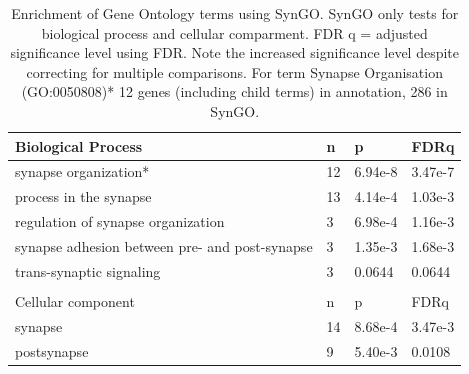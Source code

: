 \begin{table}[]
    \centering
    \begin{tabular}{llll}
    Biological Process & n & p & FDRq\\
    \hline
synapse organization*&	12&	6.94e-8	&3.47e-7\\
process in the synapse&	13&	4.14e-4	&1.03e-3\\
regulation of synapse organization	&3&	6.98e-4&	1.16e-3\\
synapse adhesion between pre- and post-synapse&	3	&1.35e-3&	1.68e-3\\
trans-synaptic signaling	&3	&0.0644&	0.0644\\
\\
 Cellular component & n & p & FDRq\\
 \hline
    synapse&14	&8.68e-4	&3.47e-3\\
postsynapse&	9	&5.40e-3	&0.0108       \\
         
\end{tabular}
    \caption{Enrichment of Gene Ontology terms using SynGO. SynGO only tests for biological process and cellular comparment. FDR q = adjusted significance level using FDR. Note the increased significance level despite correcting for multiple comparisons. For term Synapse Organisation (GO:0050808)* 12 genes (including child terms) in annotation, 286 in SynGO. }
    \label{tab:enrichment of gene ontology terms in syngo}
\end{table}



